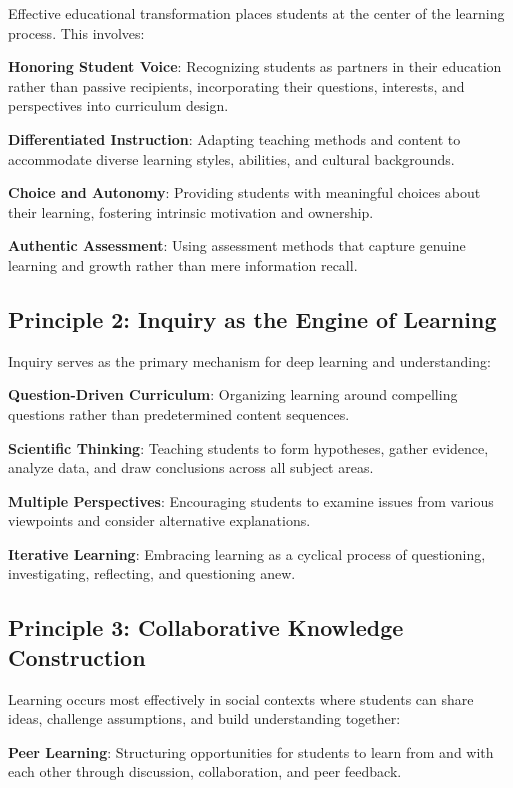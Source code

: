 \documentclass[
  Letterpaper,
]{scrbook}
\begin{document}
Effective educational transformation places students at the center of
the learning process. This involves:

\textbf{Honoring Student Voice}: Recognizing students as partners in
their education rather than passive recipients, incorporating their
questions, interests, and perspectives into curriculum design.

\textbf{Differentiated Instruction}: Adapting teaching methods and
content to accommodate diverse learning styles, abilities, and cultural
backgrounds.

\textbf{Choice and Autonomy}: Providing students with meaningful choices
about their learning, fostering intrinsic motivation and ownership.

\textbf{Authentic Assessment}: Using assessment methods that capture
genuine learning and growth rather than mere information recall.

\subsection{Principle 2: Inquiry as the Engine of
Learning}\label{principle-2-inquiry-as-the-engine-of-learning}

Inquiry serves as the primary mechanism for deep learning and
understanding:

\textbf{Question-Driven Curriculum}: Organizing learning around
compelling questions rather than predetermined content sequences.

\textbf{Scientific Thinking}: Teaching students to form hypotheses,
gather evidence, analyze data, and draw conclusions across all subject
areas.

\textbf{Multiple Perspectives}: Encouraging students to examine issues
from various viewpoints and consider alternative explanations.

\textbf{Iterative Learning}: Embracing learning as a cyclical process of
questioning, investigating, reflecting, and questioning anew.

\subsection{Principle 3: Collaborative Knowledge
Construction}\label{principle-3-collaborative-knowledge-construction}

Learning occurs most effectively in social contexts where students can
share ideas, challenge assumptions, and build understanding together:

\textbf{Peer Learning}: Structuring opportunities for students to learn
from and with each other through discussion, collaboration, and peer
feedback.
\end{document}

